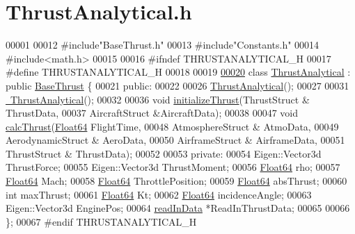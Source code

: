 \hypertarget{_thrust_analytical_8h_source}{}\section{Thrust\+Analytical.\+h}
\label{_thrust_analytical_8h_source}

\begin{DoxyCode}
00001 
00012 \textcolor{preprocessor}{#include"BaseThrust.h"}
00013 \textcolor{preprocessor}{#include"Constants.h"}
00014 \textcolor{preprocessor}{#include<math.h>}
00015 
00016 \textcolor{preprocessor}{#ifndef THRUSTANALYTICAL\_H}
00017 \textcolor{preprocessor}{#define THRUSTANALYTICAL\_H}
00018 
00019 
\hyperlink{group___engine}{00020} \textcolor{keyword}{class }\hyperlink{group___engine_class_thrust_analytical}{ThrustAnalytical} : \textcolor{keyword}{public} \hyperlink{group___engine_class_base_thrust}{BaseThrust} \{
00021 \textcolor{keyword}{public}:
00022 
00026     \hyperlink{group___engine_a5c75949a22871e861090560adb2d5f18}{ThrustAnalytical}();
00027 
00031     \hyperlink{group___engine_aeaf9dd69c10812c673d6cfae0d7ca4fd}{~ThrustAnalytical}();
00032 
00036     \textcolor{keywordtype}{void} \hyperlink{group___engine_a2bdad8d5195990b3bcb0139bc408f199}{initializeThrust}(ThrustStruct & ThrustData,
00037                           AircraftStruct &AircraftData);
00038 
00047     \textcolor{keywordtype}{void} \hyperlink{group___engine_a521b775b57dc2324f09496efb8b12452}{calcThrust}(\hyperlink{group___tools_ga3f1431cb9f76da10f59246d1d743dc2c}{Float64} FlightTime,                    
00048                     AtmosphereStruct & AtmoData,        
00049                     AerodynamicStruct & AeroData,       
00050                     AirframeStruct & AirframeData,      
00051                     ThrustStruct & ThrustData);         
00052 
00053 \textcolor{keyword}{private}:
00054     Eigen::Vector3d ThrustForce;        
00055     Eigen::Vector3d ThrustMoment;       
00056     \hyperlink{group___tools_ga3f1431cb9f76da10f59246d1d743dc2c}{Float64} rho;                     
00057     \hyperlink{group___tools_ga3f1431cb9f76da10f59246d1d743dc2c}{Float64} Mach;                        
00058     \hyperlink{group___tools_ga3f1431cb9f76da10f59246d1d743dc2c}{Float64} ThrottlePosition;            
00059     \hyperlink{group___tools_ga3f1431cb9f76da10f59246d1d743dc2c}{Float64} absThrust;                   
00060     \textcolor{keywordtype}{int} maxThrust;                      
00061     \hyperlink{group___tools_ga3f1431cb9f76da10f59246d1d743dc2c}{Float64} Kt;                          
00062     \hyperlink{group___tools_ga3f1431cb9f76da10f59246d1d743dc2c}{Float64} incidenceAngle;              
00063     Eigen::Vector3d EnginePos;          
00064     \hyperlink{classread_in_data}{readInData} *ReadInThrustData;     
00065 
00066 \};
00067 \textcolor{preprocessor}{#endif  THRUSTANALYTICAL\_H}
\end{DoxyCode}
